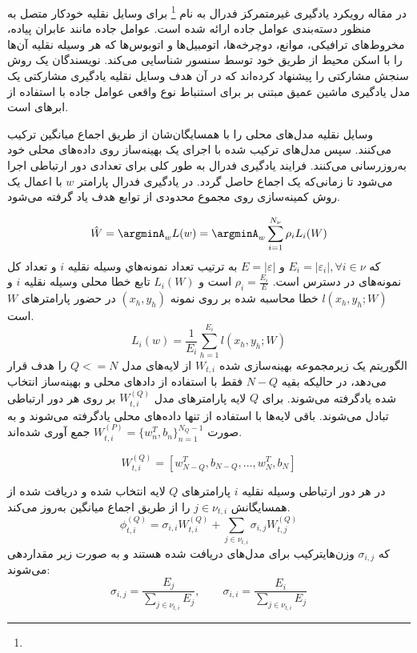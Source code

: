 در مقاله \cite{Fed7} رویکرد یادگیری غیرمتمرکز فدرال به نام \footnote{} برای وسایل نقلیه خودکار متصل به منظور دسته‌بندی عوامل جاده ارائه شده است. عوامل جاده مانند عابران پیاده، مخروط‌های ترافیکی، موانع، دوچرخه‌ها، اتومبیل‌ها و اتوبوس‌ها  که هر وسیله نقلیه آن‌ها را با اسکن محیط از طریق خود توسط سنسور  شناسایی می‌کند. نویسندگان یک روش سنجش مشارکتی را پیشنهاد کرده‌اند که در آن هدف وسایل نقلیه یادگیری مشارکتی یک مدل یادگیری ماشین عمیق مبتنی بر  برای استنباط نوع واقعی عوامل جاده با استفاده از ابرهای  است. 

وسایل نقلیه مدل‌های محلی را با همسایگان‌شان از طریق اجماع میانگین ترکیب می‌کنند. سپس مدل‌های ترکیب شده با اجرای یک بهینه‌ساز روی داده‌های محلی خود به‌روزرسانی می‌کنند. فرایند یادگیری فدرال به طور کلی برای تعدادی دور ارتباطی اجرا می‌شود تا زمانی‌که یک اجماع حاصل گردد. در یادگیری فدرال پارامتر $w$ با اعمال یک روش کمینه‌سازی روی مجموع محدودی از توابع هدف یاد گرفته می‌شود.

\begin{equation}\label{e134}
	\hat{W}=\argminA_w L(w)=\argminA_w \sum_{i=1}^{N_\nu} \rho_i L_i(W)
\end{equation}
که $E_i=|\varepsilon_i|, \forall i\in\nu$ و $E=|\varepsilon|$ به ترتیب تعداد نمونه‌هاي وسیله نقلیه $i$ و تعداد کل نمونه‌های در دسترس است. $\rho_i=\frac{E_i}{E}$ است و $L_i(W)$ تابع خطا محلی وسیله نقلیه $i$ و $l(x_h,y_h;W)$ خطا محاسبه شده بر روی نمونه $(x_h,y_h)$ در حضور پارامترهای $W$ است. 
\begin{equation}\label{e135}
	L_i(w)=\frac{1}{E_i}\sum_{h=1}^{E_i}l(x_h,y_h;W)
\end{equation}
الگوریتم  یک زیرمجموعه بهینه‌سازی شده $W_{t,i}$ از لایه‌های مدل $Q<=N$ را هدف قرار می‌دهد، در حالیکه بقیه $N-Q$ فقط با استفاده از دادهای محلی و بهینه‌ساز انتخاب شده یادگرفته می‌شوند. برای $Q$ لایه پارامترهای مدل $W_{t,i}^{(Q)}$ بر روی هر دور ارتباطی تبادل می‌شوند. باقی لایه‌ها با استفاده از تنها داده‌های محلی یادگرفته می‌شوند و به صورت  $W_{t,i}^{(P)}=\{w_n^T,b_n\}_{n=1}^{N_Q-1}$ جمع آوری شده‌اند.

\begin{equation}\label{e136}
	W_{t,i}^{(Q)}=[w_{N-Q}^T,b_{N-Q},...,w_N^T,b_N]
\end{equation}

در هر دور ارتباطی وسیله نقلیه $i$ پارامترهای $Q$ لایه انتخاب شده و دریافت شده از همسایگانش  $j\in \nu_{t,i}$ را از طریق اجماع میانگین به‌روز می‌کند.
\begin{equation}\label{e136}
	\phi_{t,i}^{(Q)}=\sigma_{i,i}W_{t,i}^{(Q)}+\sum_{j\in \nu_{t,i}}\sigma_{i,j}W_{t,j}^{(Q)}
\end{equation}
که $\sigma_{i,j}$ وزن‌هایترکیب برای مدل‌های دریافت شده هستند و به صورت زیر مقداردهی می‌شوند:
\begin{equation}\label{e137}
	\sigma_{i,j}=\frac{E_j}{\sum_{j\in \nu_{t,i}}E_j},\qquad \sigma_{i,i}=\frac{E_i}{\sum_{j\in \nu_{t,i}}E_j}
\end{equation}

